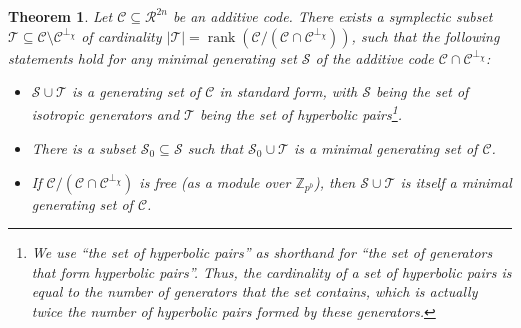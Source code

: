 \documentclass{article}
\DeclareMathOperator{\rank}{rank}
\newtheorem{thm}{Theorem}[section]
\theoremstyle{remark}
\theoremstyle{definition}
\numberwithin{equation}{section}
\begin{document}
\begin{thm}\label{thm:stdform} Let $\mathcal{C} \subseteq \mathcal{R}^{2n}$ be an additive code. There exists a symplectic subset $\mathcal{T} \subseteq \mathcal{C} \setminus \mathcal{C}^{\perp_\chi}$ of cardinality $|\mathcal{T}| = \rank(\mathcal{C}/(\mathcal{C} \cap \mathcal{C}^{\perp_\chi}))$, such that the following statements hold for \emph{any} minimal generating set $\mathcal{S}$ of the additive code $\mathcal{C} \cap \mathcal{C}^{\perp_\chi}$:
\begin{itemize}
\item[(a)] $\mathcal{S} \cup \mathcal{T}$ is a generating set of $\mathcal{C}$ in standard form, with $\mathcal{S}$ being the set of isotropic generators and $\mathcal{T}$ being the set of hyperbolic pairs\footnote{We use ``the set of hyperbolic pairs'' as shorthand for ``the set of generators that form hyperbolic pairs''. Thus, the cardinality of a set of hyperbolic pairs is equal to the number of generators that the set contains, which is actually \emph{twice} the number of hyperbolic pairs formed by these generators.\label{fn:hyppairs}}.
\item[(b)] There is a subset $\mathcal{S}_0 \subseteq \mathcal{S}$ such that $\mathcal{S}_0 \cup \mathcal{T}$ is a minimal generating set of $\mathcal{C}$.
\item[(c)] If $\mathcal{C}/(\mathcal{C} \cap \mathcal{C}^{\perp_\chi})$ is free (as a module over $\mathbb{Z}_{p^b}$), then $\mathcal{S} \cup \mathcal{T}$ is itself a minimal generating set of $\mathcal{C}$.
\end{itemize}

\end{thm}  
\end{document}
